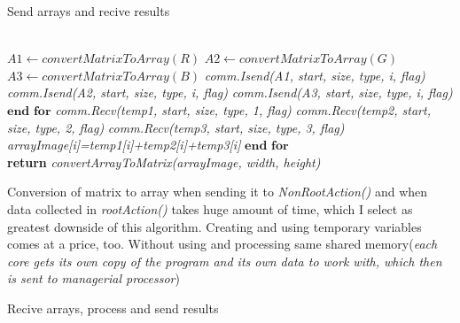 \documentclass{article}
\begin{document}
\setlength{\textfloatsep}{0pt}
\begin{algorithm}[tbph]
\caption{Send arrays and recive results}
\begin{algorithmic}[1]
\\
    \State \textit{$A1 \gets convertMatrixToArray(R)$}
    \State \textit{$A2 \gets convertMatrixToArray(G)$}
    \State \textit{$A3 \gets convertMatrixToArray(B)$}
      \State \textit{comm.Isend(A1, start, size, type, i, flag)}
    \EndIf
{}
      \State \textit{comm.Isend(A2, start, size, type, i, flag)}
    \EndIf
      \State \textit{comm.Isend(A3, start, size, type, i, flag)}
    \EndIf
     \EndFor $\textbf{end for}$
      \State \textit{comm.Recv(temp1, start, size, type, 1, flag)}
      \State \textit{comm.Recv(temp2, start, size, type, 2, flag)}
       \State \textit{comm.Recv(temp3, start, size, type, 3, flag)}
       \State \textit{arrayImage[i]=temp1[i]+temp2[i]+temp3[i]}
        \EndFor $\textbf{end for}$\\
        \State \textbf{return} \textit{convertArrayToMatrix(arrayImage, width, height)}
        
\endFunction
\end{algorithmic}
\end{algorithm}

Conversion of matrix to array when sending it to \textit{NonRootAction()} and when data collected in \textit{rootAction()} takes huge amount of time, which I  select as greatest downside of this algorithm. Creating and using temporary variables comes at a price, too. Without using and processing same shared memory(\textit{each core gets its own copy of the program and its own data to work with, which then is sent to managerial processor}) 

\setlength{\textfloatsep}{0pt}
\begin{algorithm}[tbph]
\caption{Recive arrays, process and send results}
\begin{algorithmic}[1]
   \State \textit{comm.Recv(arrayData, start, size, type, origin, flag)}
     \State  \textit{arrayData}$\gets$\Call \textit{CONVOLUTE(\textit{arrayData, width, height, kernel, kernelW, kernelH})}}
\If {($currentProcessor ==  1$)}
      \State \textit{comm.Send(arrayData, start, size, type, 0, flag)}
    \EndIf
\If {($currentProcessor ==  2$)}
      \State \textit{comm.Send(arrayData, start, size, type, 0, flag)}
    \EndIf
  \If {($currentProcessor ==  3$)}
      \State \textit{comm.Send(arrayData, start, size, type, 0, flag)}
    \EndIf
    
\endFunction
\end{algorithmic}
\end{algorithm}
\end{document}
